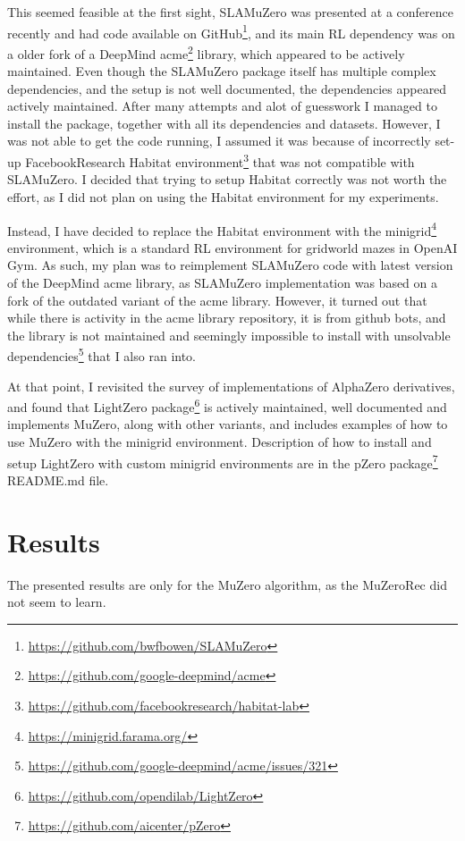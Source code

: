 \documentclass[12pt]{article}
\begin{document}
This seemed feasible at the first sight, SLAMuZero was presented at a conference recently and had code available on GitHub\footnote{\url{https://github.com/bwfbowen/SLAMuZero}}, and its main RL dependency was on a older fork of a DeepMind acme\footnote{\url{https://github.com/google-deepmind/acme}} library, which appeared to be actively maintained. Even though the SLAMuZero package itself has multiple complex dependencies, and the setup is not well documented, the dependencies appeared actively maintained. After many attempts and alot of guesswork I managed to install the package, together with all its dependencies and datasets. However, I was not able to get the code running, I assumed it was because of incorrectly set-up FacebookResearch Habitat environment\footnote{\url{https://github.com/facebookresearch/habitat-lab}} that was not compatible with SLAMuZero. I decided that trying to setup Habitat correctly was not worth the effort, as I did not plan on using the Habitat environment for my experiments.

Instead, I have decided to replace the Habitat environment with the minigrid\footnote{\url{https://minigrid.farama.org/}} environment, which is a standard RL environment for gridworld mazes in OpenAI Gym. As such, my plan was to reimplement SLAMuZero code with latest version of the DeepMind acme library, as SLAMuZero implementation was based on a fork of the outdated variant of the acme library. However, it turned out that while there is activity in the acme library repository, it is from github bots, and the library is not maintained and seemingly impossible to install with unsolvable dependencies\footnote{\url{https://github.com/google-deepmind/acme/issues/321}} that I also ran into.

At that point, I revisited the survey of implementations of AlphaZero derivatives, and found that LightZero package\footnote{\url{https://github.com/opendilab/LightZero}} is actively maintained, well documented and implements MuZero, along with other variants, and includes examples of how to use MuZero with the minigrid environment. Description of how to install and setup LightZero with custom minigrid environments are in the pZero package\footnote{\url{https://github.com/aicenter/pZero}} README.md file.

\section{Results}
The presented results are only for the MuZero algorithm, as the MuZeroRec did not seem to learn. 

\printbibliography
\end{document}
